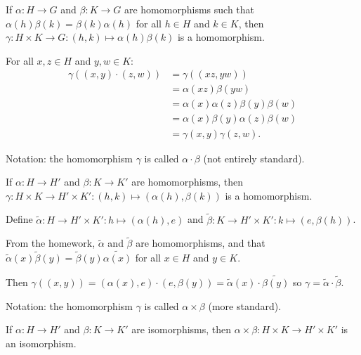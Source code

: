 \documentclass[12pt,letterpaper]{report}
\begin{document}
\begin{lem}{}{}
  If $\alpha \colon H \to G$ and $\beta \colon K \to G$ are homomorphisms such that
  $\alpha(h)\beta(k) = \beta(k)\alpha(h)$ for all $h \in H$ and $k \in K$, then
  $\gamma \colon H \times K \to G : (h, k) \mapsto \alpha(h)\beta(k)$ is a homomorphism.
\end{lem}

\begin{thmproof}
  For all $x, z \in H$ and $y, w \in K$:
  \begin{align*}
    \gamma((x, y) \cdot (z, w))
    &= \gamma((xz, yw)) \\
    &= \alpha(xz)\beta(yw) \\
    &= \alpha(x)\alpha(z)\beta(y)\beta(w) \\
    &= \alpha(x)\beta(y)\alpha(z)\beta(w) \\
    &= \gamma(x, y)\gamma(z, w).
  \end{align*}
\end{thmproof}

Notation: the homomorphism $\gamma$ is called $\alpha \cdot \beta$ (not entirely standard).

\begin{cor}{}{}
  If $\alpha \colon H \to H'$ and $\beta \colon K \to K'$ are homomorphisms, then
  $\gamma \colon H \times K \to H' \times K' : (h, k) \mapsto (\alpha(h), \beta(k))$ is a
  homomorphism.
\end{cor}

\begin{thmproof}
  Define $\tilde{\alpha} \colon H \to H' \times K' : h \mapsto (\alpha(h), e)$ and
  $\tilde{\beta} \colon K \to H' \times K' : k \mapsto (e, \beta(h))$.

  From the homework, $\tilde{\alpha}$ and $\tilde{\beta}$ are homomorphisms, and that
  $\tilde{\alpha}(x)\tilde{\beta}(y) = \tilde{\beta}(y)\tilde{\alpha(x)}$ for all $x \in H$ and
  $y \in K$.

  Then $\gamma((x, y)) = (\alpha(x), e) \cdot (e, \beta(y))
    = \tilde{\alpha}(x) \cdot \tilde{\beta(y)}$ so $\gamma = \tilde{\alpha} \cdot \tilde{\beta}$.
\end{thmproof}

Notation: the homomorphism $\gamma$ is called $\alpha \times \beta$ (more standard).

\begin{cor}{}{}
  If $\alpha \colon H \to H'$ and $\beta \colon K \to K'$ are isomorphisms, then
  $\alpha \times \beta \colon H \times K \to H' \times K'$ is an isomorphism.
\end{cor}
\end{document}

